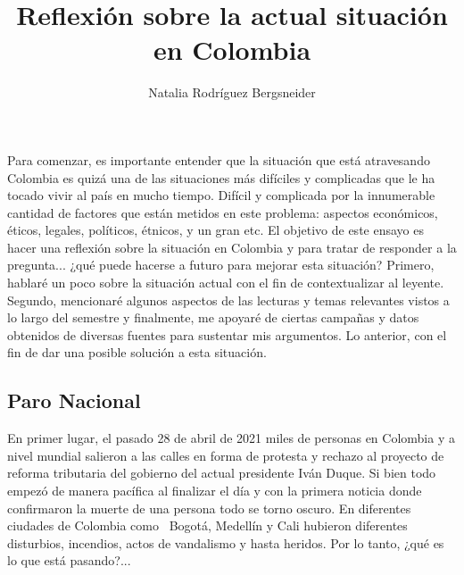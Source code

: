 \documentclass[doc, 12pt, letterpaper, donotrepeattitle, floatsintext, natbib]{apa7}
\title{\Large Reflexión sobre la actual situación en Colombia}
\author{Natalia Rodríguez Bergsneider}
\affiliation{Universidad de los Andes\\ Constitución y Democracia DERE 1300\\ Codigo: 201923806}
\begin{document}
\vspace*{-2cm}      %
\maketitle          %




\doublespacing %
Para comenzar, es importante entender que la situación que está atravesando Colombia es quizá una de las situaciones más difíciles y complicadas que le ha tocado vivir al país en mucho tiempo. Difícil y complicada por la innumerable cantidad de factores que están metidos en este problema: aspectos económicos, éticos, legales, políticos, étnicos, y un gran etc. El objetivo de este ensayo es hacer una reflexión sobre la situación en Colombia y para tratar de responder a la pregunta... ¿qué puede hacerse a futuro para mejorar esta situación? Primero, hablaré un poco sobre la situación actual con el fin de contextualizar al leyente. Segundo, mencionaré algunos aspectos de las lecturas y temas relevantes vistos a lo largo del semestre y finalmente, me apoyaré de ciertas campañas y datos obtenidos de diversas fuentes para sustentar mis argumentos. Lo anterior, con el fin de dar una posible solución a esta situación.
\noindent {}\\


\subsection{Paro Nacional} 
En primer lugar, el pasado 28 de abril de 2021 miles de personas en Colombia y a nivel mundial salieron a las calles en forma de protesta y rechazo al proyecto de reforma tributaria del gobierno del actual presidente Iván Duque. Si bien todo empezó de manera pacífica al finalizar el día y con la primera noticia donde confirmaron la muerte de una persona todo se torno oscuro. En diferentes ciudades de Colombia como \ Bogotá, Medellín y Cali hubieron diferentes disturbios, incendios, actos de vandalismo y hasta heridos. Por lo tanto, ¿qué es lo que está pasando?...
\end{document}
